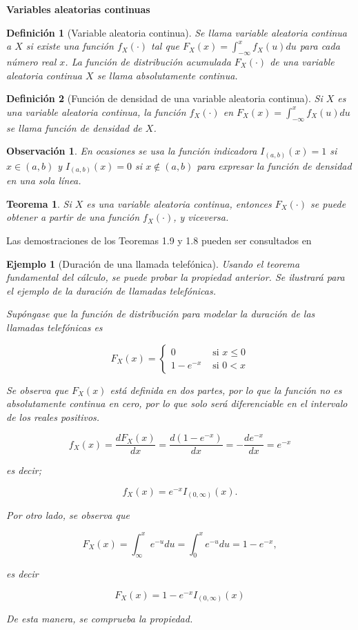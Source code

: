 \documentclass[12pt]{article}
\newtheorem{theorem}{Teorema}[section]
\newtheorem*{remark}{Observación}
\newtheorem*{example}{Ejemplo}
\newtheorem{definition}{Definición}
\begin{document}
\textbf{Variables aleatorias continuas}  
\begin{definition}[Variable aleatoria continua]
    Se llama variable aleatoria continua a $X$ si existe una función $f_X(\cdot)$ tal que $F_X(x)=\int_{-\infty}^x f_X(u) du$ para cada número real $x$. La función de distribución acumulada $F_X(\cdot)$ de una variable aleatoria continua $X$ se llama absolutamente continua.
\end{definition}

\begin{definition}[Función de densidad de una variable aleatoria continua]
    Si $X$ es una variable aleatoria continua, la función $f_X(\cdot)$ en $F_X(x)=\int_{-\infty}^x f_X(u)du$ se llama función de densidad de $X$.
\end{definition}

\begin{remark}
    En ocasiones se usa la función indicadora $I_{(a,b)}(x)=1$ si $x\in (a,b)$ y $I_{(a,b)}(x)=0$ si $x\notin (a,b)$ para expresar la función de densidad en una sola línea.
\end{remark}

\begin{theorem}
    Si $X$ es una variable aleatoria continua, entonces $F_X(\cdot)$ se puede obtener a partir de una función $f_X(\cdot)$, y viceversa.
\end{theorem}

Las demostraciones de los Teoremas 1.9 y 1.8 pueden ser consultados en \cite{mood86}

\begin{example}[Duración de una llamada telefónica]
    Usando el teorema fundamental del cálculo, se puede probar la propiedad anterior. Se ilustrará para el ejemplo de la duración de llamadas telefónicas.

Supóngase que la función de distribución para modelar la duración de las llamadas telefónicas es

$$
F_X(x)=\begin{cases}0 & \text{ si } x \le 0\\
1-e^{-x} & \text{ si } 0< x\end{cases}
$$

Se observa que $F_X(x)$ está definida en dos partes, por lo que la función no es absolutamente continua en cero, por lo que solo será diferenciable en el intervalo de los reales positivos.

$$
f_X(x)=\frac{dF_X(x)}{dx}=\frac{d (1-e^{-x})}{dx}=-\frac{d e^{-x}}{dx}=e^{-x}
$$

es decir;

$$
f_X(x)=e^{-x}I_{(0,\infty)}(x).
$$

Por otro lado, se observa que

$$
F_X(x)= \int_{\infty}^x e^{-u}du=\int_0^x e^{-u}du=1-e^{-x},
$$

es decir

$$
F_X(x)=1-e^{-x} I_{(0,\infty)}(x)
$$

De esta manera, se comprueba la propiedad.
\end{example}
\end{document}
